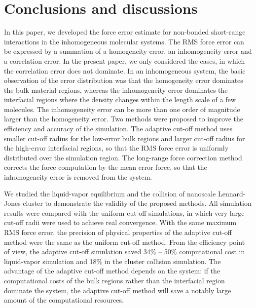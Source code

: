 \documentclass[aps, pre, preprint]{revtex4}
\begin{document}
\section{Conclusions and discussions}\label{sec:conclusion}

In this paper, we developed the force error estimate for non-bonded
short-range interactions in the inhomogeneous molecular systems. The
RMS force error can be expressed by a summation of a homogeneity
error, an inhomogeneity error and a correlation error. In the present
paper, we only considered the cases, in which the correlation error
does not dominate. In an inhomogeneous system, the basic observation
of the error distribution was that the homogeneity error dominates the
bulk material regions, whereas the inhomogeneity error dominates the
interfacial regions where the density changes within the length scale
of a few molecules. The inhomogeneity error can be more than one
order of magnitude larger than the homogeneity error.  Two methods
were proposed to improve the efficiency and accuracy of the
simulation. The adaptive cut-off method uses smaller cut-off radius
for the low-error bulk regions and larger cut-off radius for the
high-error interfacial regions, so that the RMS force error is
uniformly distributed over the simulation region. The long-range force
correction method corrects the force computation by the mean error
force, so that the inhomogeneity error is removed from the system.

We studied the liquid-vapor equilibrium and the collision of nanoscale
Lennard-Jones cluster to demonstrate the validity of the proposed
methods.  All simulation results were compared with the uniform
cut-off simulations, in which very large cut-off radii were used to
achieve real convergence.  With the same maximum RMS force error,
the precision of physical properties of the adaptive cut-off method
were the same as the uniform cut-off method. From the efficiency
point of view,
the adaptive cut-off simulation saved 34\% -- 50\% computational cost
in liquid-vapor simulation and 18\% in the cluster collision simulation.
The advantage of the adaptive cut-off method depends on the
system:{
  if the computational costs of the bulk regions rather than the
  interfacial region dominate the system,}
the adaptive cut-off method will save a notably large amount of the
computational resources.
\end{document}

